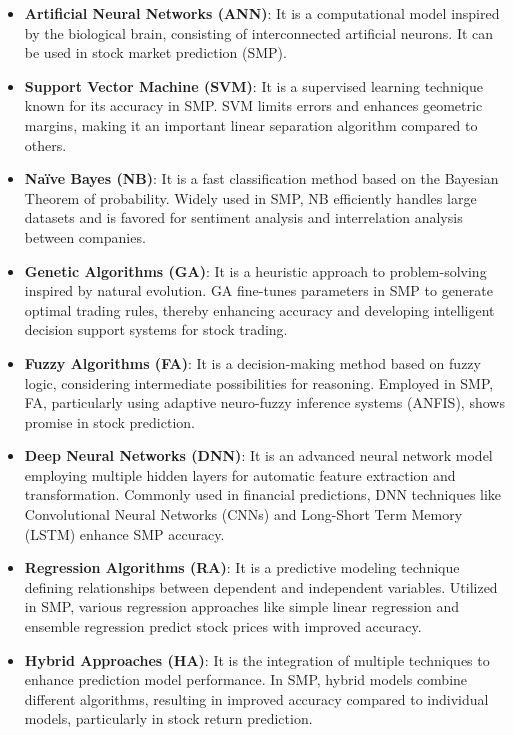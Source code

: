 \documentclass[conference]{IEEEtran}
\begin{document}
\begin{itemize}
    \item \textbf{Artificial Neural Networks (ANN)}: It is a computational model inspired by the biological brain, consisting of interconnected artificial neurons. It can be used in stock market prediction (SMP)\cite{Mukherjee2021}.
    
    \item \textbf{Support Vector Machine (SVM)}: It is a supervised learning technique known for its accuracy in SMP. SVM limits errors and enhances geometric margins, making it an important linear separation algorithm compared to others\cite{Mukherjee2021}.
    
    \item \textbf{Naïve Bayes (NB)}: It is a fast classification method based on the Bayesian Theorem of probability. Widely used in SMP, NB efficiently handles large datasets and is favored for sentiment analysis and interrelation analysis between companies\cite{Mukherjee2021}.
    
    \item \textbf{Genetic Algorithms (GA)}: It is a heuristic approach to problem-solving inspired by natural evolution. GA fine-tunes parameters in SMP to generate optimal trading rules, thereby enhancing accuracy and developing intelligent decision support systems for stock trading\cite{Mukherjee2021}.
    
    \item \textbf{Fuzzy Algorithms (FA)}: It is a decision-making method based on fuzzy logic, considering intermediate possibilities for reasoning. Employed in SMP, FA, particularly using adaptive neuro-fuzzy inference systems (ANFIS), shows promise in stock prediction\cite{Mukherjee2021}.
    
    \item \textbf{Deep Neural Networks (DNN)}: It is an advanced neural network model employing multiple hidden layers for automatic feature extraction and transformation. Commonly used in financial predictions, DNN techniques like Convolutional Neural Networks (CNNs) and Long-Short Term Memory (LSTM) enhance SMP accuracy\cite{Mukherjee2021}.
    
    \item \textbf{Regression Algorithms (RA)}: It is a predictive modeling technique defining relationships between dependent and independent variables. Utilized in SMP, various regression approaches like simple linear regression and ensemble regression predict stock prices with improved accuracy\cite{Mukherjee2021}.
    
    \item \textbf{Hybrid Approaches (HA)}: It is the integration of multiple techniques to enhance prediction model performance. In SMP, hybrid models combine different algorithms, resulting in improved accuracy compared to individual models, particularly in stock return prediction\cite{Mukherjee2021}.
\end{itemize}
\end{document}
